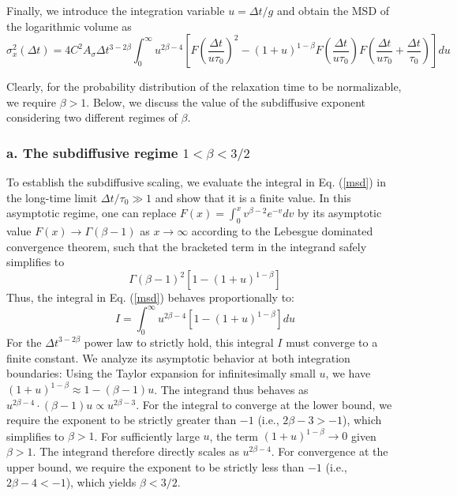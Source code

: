\documentclass[aps, prl, longbibliography, linenumbers, superscriptaddress]{revtex4-2}
\begin{document}
Finally, we introduce the integration variable $u = \Delta t / g$ and obtain the MSD of the logarithmic volume as
\begin{equation}
	\sigma_x^2(\Delta t) =4C^2A_{\sigma} \Delta t^{3-2\beta} \int_0^\infty u^{2\beta-4} \left[ F\left(\frac{\Delta t}{u\tau_0}\right)^2 - (1+u)^{1-\beta} F\left(\frac{\Delta t}{u\tau_0}\right) F\left(\frac{\Delta t}{u\tau_0} + \frac{\Delta t}{\tau_0}\right) \right] du 
	\label{msd}
\end{equation}

Clearly, for the probability distribution of the relaxation time to be normalizable, we require $\beta>1$. Below, we discuss the value of the subdiffusive exponent considering two different regimes of $\beta$.

\subsubsection{a. The subdiffusive regime $1 < \beta < 3/2$}

To establish the subdiffusive scaling, we evaluate the integral in Eq. (\ref{msd}) in the long-time limit $\Delta t / \tau_0 \gg 1$ and show that it is a finite value. In this asymptotic regime, one can replace $F(x) = \int_0^x v^{\beta-2} e^{-v} dv$ by its asymptotic value $F(x) \to \Gamma(\beta-1)$ as $x \to \infty$ according to the Lebesgue dominated convergence theorem, such that the bracketed term in the integrand safely simplifies to
\begin{equation}
\Gamma(\beta-1)^2 \left[ 1 - (1+u)^{1-\beta} \right] 
\end{equation}
Thus, the integral in Eq. (\ref{msd}) behaves proportionally to:
\begin{equation}
I = \int_0^\infty u^{2\beta-4} \left[ 1 - (1+u)^{1-\beta} \right] du 
\end{equation}
For the $\Delta t^{3-2\beta}$ power law to strictly hold, this integral $I$ must converge to a finite constant. We analyze its asymptotic behavior at both integration boundaries: Using the Taylor expansion for infinitesimally small $u$, we have $(1+u)^{1-\beta} \approx 1 - (\beta-1)u$. The integrand thus behaves as $u^{2\beta-4} \cdot (\beta-1)u \propto u^{2\beta-3}$. For the integral to converge at the lower bound, we require the exponent to be strictly greater than $-1$ (i.e., $2\beta-3 > -1$), which simplifies to $\beta > 1$. For sufficiently large $u$, the term $(1+u)^{1-\beta} \to 0$ given $\beta > 1$. The integrand therefore directly scales as $u^{2\beta-4}$. For convergence at the upper bound, we require the exponent to be strictly less than $-1$ (i.e., $2\beta-4 < -1$), which yields $\beta < 3/2$.
\end{document}
